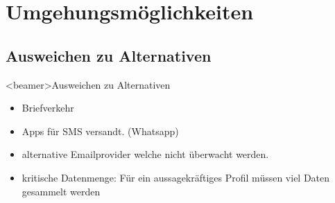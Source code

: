 \section{Umgehungsmöglichkeiten}
  \subsection{Ausweichen zu Alternativen}
    \begin{frame}<beamer>{Ausweichen zu Alternativen}
      \begin{itemize}
        \item Briefverkehr
        \item Apps für SMS versandt. (Whatsapp)
        \item alternative Emailprovider welche nicht überwacht werden.
        \item kritische Datenmenge: Für ein aussagekräftiges Profil müssen viel Daten gesammelt werden
        

      \end{itemize}
    \end{frame}
